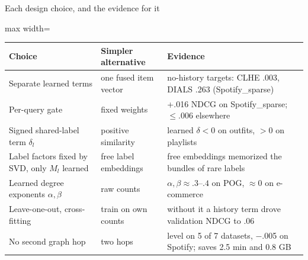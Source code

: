 \documentclass[10pt,aspectratio=169]{beamer}
\begin{document}
\begin{frame}{Each design choice, and the evidence for it}
\renewcommand{\arraystretch}{1.12}\small
\begin{adjustbox}{max width=\textwidth}\begin{tabular}{@{}>{\raggedright\arraybackslash}p{}>{\raggedright\arraybackslash}p{}>{\raggedright\arraybackslash}p{}@{}}
\toprule
\textbf{Choice} & \textbf{Simpler alternative} & \textbf{Evidence}\\\midrule
Separate learned terms & one fused item vector & no-history targets: CLHE .003, DIALS .263 (Spotify\_sparse)\\
Per-query gate & fixed weights & +.016 NDCG on Spotify\_sparse; $\le$.006 elsewhere\\
Signed shared-label term $\delta_l$ & positive similarity & learned $\delta<0$ on outfits, $>0$ on playlists\\
Label factors fixed by SVD, only $M_l$ learned & free label embeddings & free embeddings memorized the bundles of rare labels\\
Learned degree exponents $\alpha,\beta$ & raw counts & $\alpha,\beta\approx.3$--$.4$ on POG, $\approx0$ on e-commerce\\
Leave-one-out, cross-fitting & train on own counts & without it a history term drove validation NDCG to .06\\
No second graph hop & two hops & level on 5 of 7 datasets, $-$.005 on Spotify; saves 2.5 min and 0.8 GB\\\bottomrule
\end{tabular}\end{adjustbox}
\end{frame}
\end{document}
